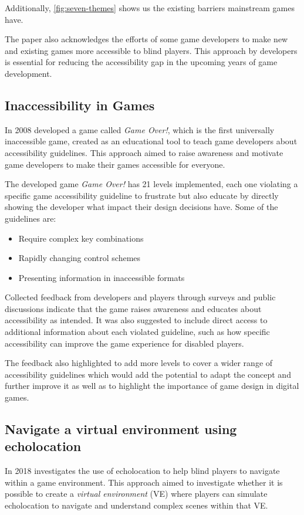 \documentclass[sigconf,natbib=false,10pt]{acmart}
\begin{document}
	Additionally, \autoref{fig:seven-themes} shows us the existing barriers mainstream games have.
	
	The paper also acknowledges the efforts of some game developers to make new and existing games more accessible to blind players.
	This approach by developers is essential for reducing the accessibility gap in the upcoming years of game development.
	
	\subsection{Inaccessibility in Games}
	In 2008 \textcite{grammenos_game_2008} developed a game called \emph{Game Over!}, which is the first universally inaccessible game, created as an educational tool to teach game developers about accessibility guidelines.
	This approach aimed to raise awareness and motivate game developers to make their games accessible for everyone.
	
	The developed game \emph{Game Over!} has 21 levels implemented, each one violating a specific game accessibility guideline to frustrate but also educate by directly showing the developer what impact their design decisions have. 
	Some of the guidelines are:
	
	\begin{itemize}
		\setlength\itemsep{0.5em}
		\item Require complex key combinations
		\item Rapidly changing control schemes
		\item Presenting information in inaccessible formats
	\end{itemize}

 	Collected feedback from developers and players through surveys and public discussions indicate that the game raises awareness and educates about accessibility as intended.
 	It was also suggested to include direct access to additional information about each violated guideline, such as how specific accessibility can improve the game experience for disabled players.
 	
 	The feedback also highlighted to add more levels to cover a wider range of accessibility guidelines which would add the potential to adapt the concept and further improve it as well as to highlight the importance of game design in digital games.
	
	\subsection{Navigate a virtual environment using echolocation}
	In 2018 \textcite{andrade_echo-house_2018} investigates the use of echolocation to help blind players to navigate within a game environment.
	This approach aimed to investigate whether it is possible to create a \emph{virtual environment} (VE) where players can simulate echolocation to navigate and understand complex scenes within that VE.
	
\end{document}
